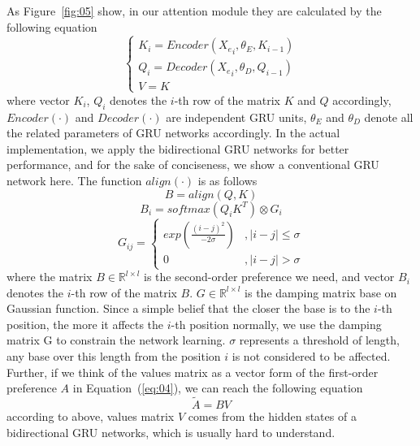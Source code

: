 \documentclass{bioinfo}
\begin{document}
As Figure~\ref{fig:05} show, in our attention module they are calculated by the following equation
\begin{equation}
\left\{\begin{array}{l}
K_i=Encoder({X_e}_i,\theta_E,K_{i-1})
\\ Q_i=Decoder({X_e}_i,\theta_D,Q_{i-1})
\\V=K 
\end{array}\right.\label{eq:14}
\end{equation}
where vector $K_i$, $Q_i$ denotes the $i$-th row of the matrix $K$ and $Q$ accordingly, $Encoder(\cdot)$ and $Decoder(\cdot)$ are independent GRU units, $\theta_E$ and $\theta_D$ denote all the related parameters of GRU networks accordingly. 
In the actual implementation, we apply the bidirectional GRU networks for better performance, and for the sake of conciseness, we show a conventional GRU network here. 
The function $align(\cdot)$ is as follows
\begin{equation}
B=align(Q,K)\label{eq:16}
\end{equation}
\begin{equation}
B_i=softmax(Q_iK^T)\otimes G_i\label{eq:17}
\end{equation}
\begin{equation}
G_{ij}=\left\{\begin{matrix}
exp(\frac{(i-j)^2}{-2\sigma})&,\left | i-j \right |\leqslant \sigma
\\ 0&,\left | i-j \right |>  \sigma
\end{matrix}\right.\label{eq:18}
\end{equation}
where the matrix $B\in\mathbb{R}^{l\times l}$ is the second-order preference we need, and vector $B_i$ denotes the $i$-th row of the matrix $B$. 
$G\in\mathbb{R}^{l\times l}$ is the damping matrix base on Gaussian function. 
Since a simple belief that the closer the base is to the $i$-th position, the more it affects the $i$-th position normally, we use the damping matrix G to constrain the network learning. 
$\sigma$ represents a threshold of length, any base over this length from the position $i$ is not considered to be affected.
Further, if we think of the values matrix as a vector form of the first-order preference $A$ in Equation~(\ref{eq:04}), we can reach the following equation
\begin{equation}
\tilde{A}=BV\label{eq:19}
\end{equation}
according to above, values matrix $V$ comes from the hidden states of a bidirectional GRU networks, which is usually hard to understand.
\end{document}
